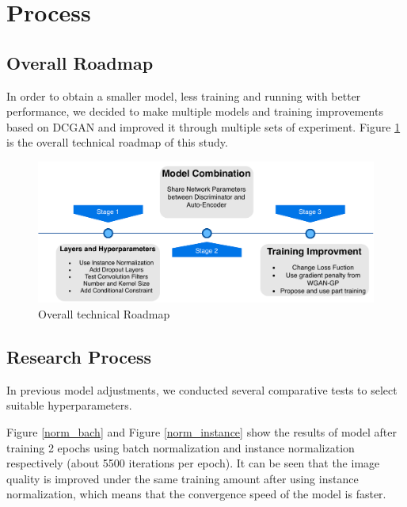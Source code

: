 \section{Process}
\subsection{Overall Roadmap}

In order to obtain a smaller model, less training and running with better performance,
we decided to make multiple models and training improvements based on DCGAN and improved it through multiple sets of experiment.
Figure \ref{roadmap} is the overall technical roadmap of this study.

\begin{figure}
    \begin{center}
    \includegraphics[width=\textwidth]{figures/roadmap.pdf}
    \caption{Overall technical Roadmap}
    \label{roadmap}
    \end{center}
\end{figure}


\subsection{Research Process}

In previous model adjustments, we conducted several comparative tests to select suitable hyperparameters.

Figure \ref{norm_bach} and Figure \ref{norm_instance} show the results of model after training 2 epochs using batch normalization and instance normalization respectively (about 5500 iterations per epoch).
It can be seen that the image quality is improved under the same training amount after using instance normalization,
    which means that the convergence speed of the model is faster.

